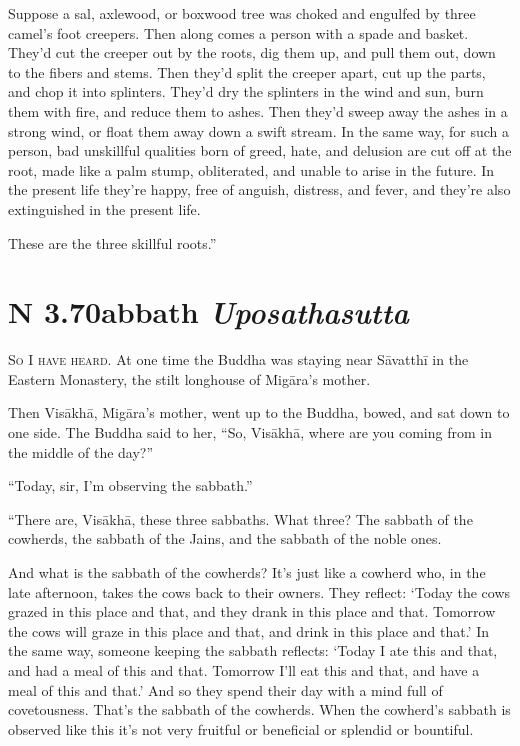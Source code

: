 \documentclass[12pt,openany]{book}%
\newcommand*{\suttatitleacronym}[1]{\smaller[2]{#1}\vspace*{.3em}}
\newcommand*{\suttatitletranslation}[1]{\linebreak{#1}}
\newcommand*{\suttatitleroot}[1]{\linebreak\smaller[2]\itshape{#1}}
\newcommand*{\tocacronym}[1]{\hspace*{-3.3em}{#1}\quad}
\newcommand*{\toctranslation}[1]{#1}
\newcommand*{\tocroot}[1]{(\textit{#1})}
\newcommand*{\scevam}[1]{\textsc{#1}}
\begin{document}
Suppose a sal, axlewood, or boxwood tree was choked and engulfed by three camel’s foot creepers. Then along comes a person with a spade and basket. They’d cut the creeper out by the roots, dig them up, and pull them out, down to the fibers and stems. Then they’d split the creeper apart, cut up the parts, and chop it into splinters. They’d dry the splinters in the wind and sun, burn them with fire, and reduce them to ashes. Then they’d sweep away the ashes in a strong wind, or float them away down a swift stream. In the same way, for such a person, bad unskillful qualities born of greed, hate, and delusion are cut off at the root, made like a palm stump, obliterated, and unable to arise in the future. In the present life they’re happy, free of anguish, distress, and fever, and they’re also extinguished in the present life. 

These are the three skillful roots.” 

%
\section*{{\suttatitleacronym AN 3.70}{\suttatitletranslation Sabbath }{\suttatitleroot Uposathasutta}}
\addcontentsline{toc}{section}{\tocacronym{AN 3.70} \toctranslation{Sabbath } \tocroot{Uposathasutta}}

\scevam{So I have heard. }At one time the Buddha was staying near \textsanskrit{Sāvatthī} in the Eastern Monastery, the stilt longhouse of \textsanskrit{Migāra}’s mother. 

Then \textsanskrit{Visākhā}, \textsanskrit{Migāra}’s mother, went up to the Buddha, bowed, and sat down to one side. The Buddha said to her, “So, \textsanskrit{Visākhā}, where are you coming from in the middle of the day?” 

“Today, sir, I’m observing the sabbath.” 

“There are, \textsanskrit{Visākhā}, these three sabbaths. What three? The sabbath of the cowherds, the sabbath of the Jains, and the sabbath of the noble ones. 

And what is the sabbath of the cowherds? It’s just like a cowherd who, in the late afternoon, takes the cows back to their owners. They reflect: ‘Today the cows grazed in this place and that, and they drank in this place and that. Tomorrow the cows will graze in this place and that, and drink in this place and that.’ In the same way, someone keeping the sabbath reflects: ‘Today I ate this and that, and had a meal of this and that. Tomorrow I’ll eat this and that, and have a meal of this and that.’ And so they spend their day with a mind full of covetousness. That’s the sabbath of the cowherds. When the cowherd’s sabbath is observed like this it’s not very fruitful or beneficial or splendid or bountiful. 
\end{document}
